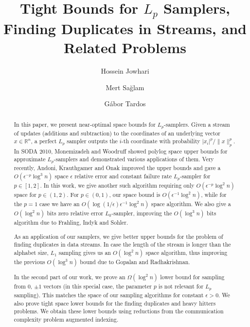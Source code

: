 \documentclass[9pt,letterpaper]{article}
\title{\Large\bf Tight Bounds for $L_p$ Samplers, Finding Duplicates in
  Streams, and Related Problems}
\author[1]{Hossein Jowhari}
\author[1]{Mert Sa\u{g}lam}
\affil[1]{Simon Fraser University, Burnaby, Canada}
\author[1,2]{G\'abor Tardos}
\affil[2]{R\'enyi Institute of Mathematics, Budapest, Hungary}
\date{}
\theoremstyle{remark}
\begin{document}
\maketitle
\sectionfont{\fontsize{11}{11}\selectfont}
\subsectionfont{\fontsize{10}{11}\selectfont}
\paragraphfont{\fontsize{9}{11}\selectfont}
\subparagraphfont{\fontsize{9}{11}\selectfont}
\minisecfont{\fontsize{9}{11}\selectfont}
\fontsize{9}{11}\selectfont
%
%
\setlength{\abstitleskip}{-\absparindent}
\thispagestyle{empty}
\vspace{-7.5mm}
\begin{abstract}
In this paper, we present near-optimal space bounds for $L_p$-samplers.
Given a stream of updates (additions and subtraction) to the coordinates of
an underlying vector $x \in \mathbb R^n$, a perfect $L_p$ sampler outputs
 the $i$-th coordinate with probability $|x_i|^p/\|x\|_p^p$.
In SODA 2010, Monemizadeh and Woodruff showed polylog space upper bounds for
 approximate $L_p$-samplers and demonstrated various applications of them.
Very recently, Andoni, Krauthgamer and Onak improved the
upper bounds and gave a $O(\epsilon^{-p}\log^3 n)$ space $\epsilon$
relative error and constant failure rate $L_p$-sampler for $p \in [1,2]$.
In this work, we give another such algorithm requiring only
$O(\epsilon^{-p}\log^2n)$ space for $p \in (1,2)$. For $p \in (0,1)$,
our space bound is  $O(\epsilon^{-1}\log^2n)$, while for the $p=1$ case we have
an $O(\log(1/\epsilon)\epsilon^{-1}\log^2n)$ space algorithm.
We also give a $O(\log^2 n)$ bits zero relative error
$L_0$-sampler, improving the $O(\log^3 n)$ bits algorithm due to  Frahling, Indyk and Sohler.


As an application of our samplers, we give better upper bounds
for the problem of finding duplicates in data streams. In case
the length of the stream is longer than the
alphabet size, $L_1$ sampling gives us an $O(\log^2 n)$ space
algorithm, thus improving the previous $O(\log^3 n)$ bound due to Gopalan
and Radhakrishnan.

In the second part of our work, we prove an $\Omega(\log^2 n)$ lower bound for
sampling
from 0, $\pm1$ vectors (in this special case, the parameter $p$ is not relevant for
$L_p$ sampling).
 This matches the space of our sampling algorithms for constant
$\epsilon>0$. We also prove tight space lower bounds for
the finding duplicates and
heavy hitters problems. We obtain these lower bounds
using reductions from the communication complexity problem augmented indexing.
\end{abstract}
  
\end{document}
